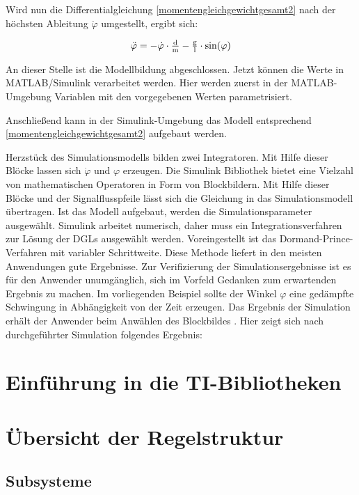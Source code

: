 Wird nun die Differentialgleichung \ref{momentengleichgewichtgesamt2} nach der höchsten Ableitung $\ddot\varphi$ umgestellt, ergibt sich:

\begin{align}
	\ddot\varphi = -\dot\varphi \cdot \tfrac{\i{d}}{\i{m}} - \tfrac{\i{g}}{\i{l}} \cdot \si{sin}(\varphi)
	\label{diffgleichung} 
\end{align}

An dieser Stelle ist die Modellbildung abgeschlossen. Jetzt können die Werte in MATLAB/Simulink  verarbeitet werden.
Hier werden zuerst in der MATLAB-Umgebung Variablen mit den vorgegebenen Werten parametrisiert.


Anschließend kann in der Simulink-Umgebung das Modell entsprechend \ref{momentengleichgewichtgesamt2} aufgebaut werden.


Herzstück des Simulationsmodells bilden zwei Integratoren.
Mit Hilfe dieser Blöcke lassen sich  $\dot\varphi$ und $\varphi$ erzeugen.
Die Simulink Bibliothek bietet eine Vielzahl von mathematischen Operatoren in Form von Blockbildern.
Mit Hilfe dieser Blöcke und der Signalflusspfeile lässt sich die Gleichung in das Simulationsmodell übertragen.
Ist das Modell aufgebaut, werden die Simulationsparameter ausgewählt. 
Simulink arbeitet numerisch, daher muss ein Integrationsverfahren zur Lösung der DGLs ausgewählt werden. Voreingestellt ist das Dormand-Prince-Verfahren mit variabler Schrittweite.
Diese Methode liefert in den meisten Anwendungen gute Ergebnisse. \autocite[S.~6]{scherf2010}
Zur Verifizierung der Simulationsergebnisse ist es für den Anwender unumgänglich, sich im Vorfeld Gedanken zum erwartenden Ergebnis zu machen.
Im vorliegenden Beispiel sollte der Winkel $\varphi$ eine gedämpfte Schwingung in Abhängigkeit von der Zeit erzeugen.
Das Ergebnis der Simulation erhält der Anwender beim Anwählen des Blockbildes \grqq.
Hier zeigt sich nach durchgeführter Simulation folgendes Ergebnis:



\section{Einführung in die TI-Bibliotheken}\label{sec:TI}

\section{Übersicht der Regelstruktur}\label{sec:ueberregelung}

\subsection{Subsysteme}





